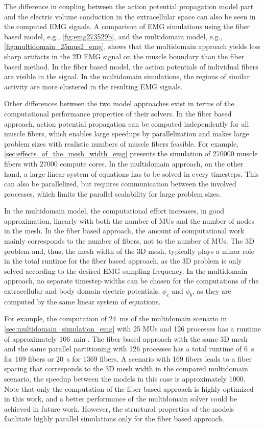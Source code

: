 The difference in coupling between the action potential propagation model part and the electric volume conduction in the extracellular space can also be seen in the computed EMG signals. A comparison of EMG simulations using the fiber based model, e.g., \cref{fig:emg273529b}, and the multidomain model, e.g., \cref{fig:multidomain_25mus2_emg}, shows that the multidomain approach yields less sharp artifacts in the 2D EMG signal on the muscle boundary than the fiber based method. In the fiber based model, the action potentials of individual fibers are visible in the signal. In the multidomain simulations, the regions of similar activity are more clustered in the resulting EMG signals.

Other differences between the two model approaches exist in terms of the computational performance properties of their solvers. In the fiber based approach, action potential propagation can be computed independently for all muscle fibers, which enables large speedups by parallelization and makes large problem sizes with realistic numbers of muscle fibers feasible. For example, \cref{sec:effects_of_the_mesh_width_emg} presents the simulation of \num{270000} muscle fibers with \num{27000} compute cores.
In the multidomain approach, on the other hand, a large linear system of equations has to be solved in every timesteps. This can also be parallelized, but requires communication between the involved processes, which limits the parallel scalability for large problem sizes.

In the multidomain model, the computational effort increases, in good approximation, linearly with both the number of MUs and the number of nodes in the mesh. In the fiber based approach, the amount of computational work mainly corresponds to the number of fibers, not to the number of MUs. 
The 3D problem and, thus, the mesh width of the 3D mesh, typically plays a minor role in the total runtime for the fiber based approach, as the 3D problem is only solved according to the desired EMG sampling frequency. In the multidomain approach, no separate timestep widths can be chosen for the computations of the extracellular and body domain electric potentials, $\phi_e$ and $\phi_b$, as they are computed by the same linear system of equations.

For example, the computation of \SI{24}{\ms} of the multidomain scenario in \cref{sec:multidomain_simulation_emg} with 25 MUs and 126 processes has a runtime of approximately $\SI{106}{\min}$. The fiber based approach with the same 3D mesh and the same parallel partitioning with 126 processes has a total runtime of \SI{6}{\s} for 169 fibers or \SI{20}{\s} for 1369 fibers. A scenario with 169 fibers leads to a fiber spacing that corresponds to the 3D mesh width in the compared multidomain scenario, the speedup between the models in this case is approximately \num{1000}.
Note that only the computation of the fiber based approach is highly optimized in this work, and a better performance of the multidomain solver could be achieved in future work. However, the structural properties of the models facilitate highly parallel simulations only for the fiber based approach.


